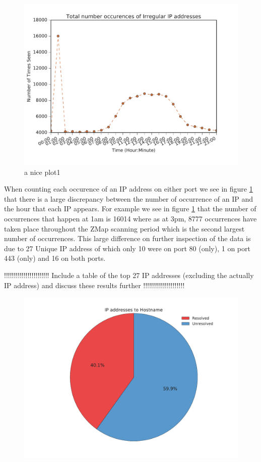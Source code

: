 \documentclass[a4wide,leqno,12pt]{report}
\begin{document}
\begin{figure}[h!]
\includegraphics[scale=.5]{pdf_images/TotalNumberOccurencesOfIrregularIPaddressesOnAverage}
\caption{a nice plot1}
\label{fig:irreg_occurence}
\end{figure}
When counting each occurence of an IP address on either port we see in figure \ref{fig:irreg_occurence} that there is a large discrepancy between the number of occurrence of an IP and the hour that each IP appears. For example we see in figure \ref{fig:irreg_occurence} that the number of occurrences that happen at 1am is 16014 where as at 3pm, 8777 occurrences have taken place throughout the ZMap scanning period which is the second largest number of occurrences. This large difference on further inspection of the data is due to 27 Unique IP address of which only 10 were on port 80 (only), 1 on port 443 (only) and 16 on both ports.

!!!!!!!!!!!!!!!!!!!!!!! Include a table of the top 27 IP addresses (excluding the  actually IP address) and discuss these results further !!!!!!!!!!!!!!!!!!!!!\\


\begin{figure}[h!]
\includegraphics[scale=.5]{pdf_images/IpstoHostname}
\end{figure}
\end{document}
